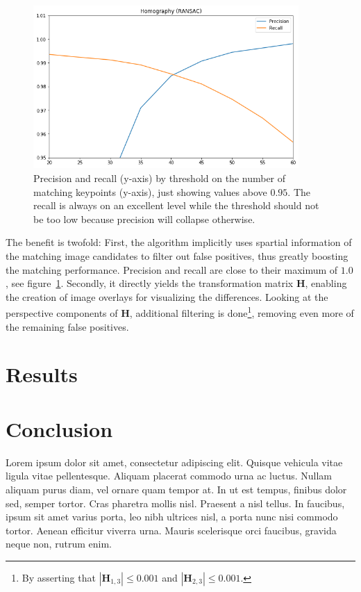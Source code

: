 \documentclass{ltjarticle}
\begin{document}
\begin{figure}[p]
    \centering
    \includegraphics[width=0.9\textwidth]{ransac-performance.png}
    \caption[RANSAC performance]{Precision and recall (y-axis) by threshold on the number of matching keypoints (y-axis), just showing values above $0.95$. The recall is always on an excellent level while the threshold should not be too low because precision will collapse otherwise.}
    \label{fig:ransac}
\end{figure}

The benefit is twofold: First, the algorithm implicitly uses spartial information of the matching image candidates to filter out false positives, thus greatly boosting the matching performance. Precision and recall are close to their maximum of $1.0$, see figure~\ref{fig:ransac}. Secondly, it directly yields the transformation matrix $\mathbf{H}$, enabling the creation of image overlays for visualizing the differences. Looking at the perspective components of $\mathbf{H}$, additional filtering is done\footnote{By asserting that $|\mathbf{H}_{1,3}| \leq 0.001$ and $|\mathbf{H}_{2,3}| \leq 0.001$.}, removing even more of the remaining false positives.

\section{Results}



\section{Conclusion}

Lorem ipsum dolor sit amet, consectetur adipiscing elit. Quisque vehicula vitae ligula vitae pellentesque. Aliquam placerat commodo urna ac luctus. Nullam aliquam purus diam, vel ornare quam tempor at. In ut est tempus, finibus dolor sed, semper tortor. Cras pharetra mollis nisl. Praesent a nisl tellus. In faucibus, ipsum sit amet varius porta, leo nibh ultrices nisl, a porta nunc nisi commodo tortor. Aenean efficitur viverra urna. Mauris scelerisque orci faucibus, gravida neque non, rutrum enim.
\end{document}
